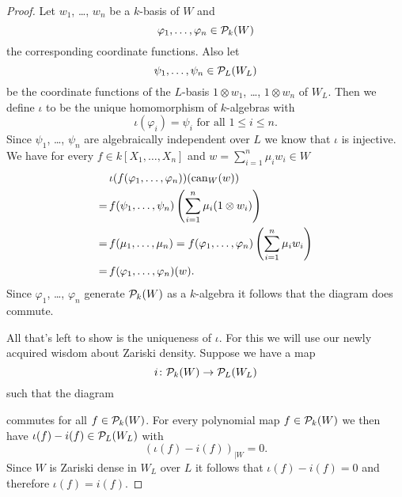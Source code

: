 \begin{proof}
 Let $w_1$, \dots, $w_n$ be a $k$-basis of $W$ and
 \[
  \varphi_1, \dotsc, \varphi_n \in \mathcal{P}_k(W)
 \]
 the corresponding coordinate functions. Also let
 \[
  \psi_1, \dotsc, \psi_n \in \mathcal{P}_L(W_L)
 \]
 be the coordinate functions of the $L$-basis $1 \otimes w_1$, \dots, $1 \otimes w_n$ of $W_L$. Then we define $\iota$ to be the unique homomorphism of $k$-algebras with
 \[
  \iota(\varphi_i) = \psi_i \text{ for all } 1 \leq i \leq n.
 \]
 Since $\psi_1$, \dots, $\psi_n$ are algebraically independent over $L$ we know that $\iota$ is injective. We have for every $f \in k[X_1, \dotsc, X_n]$ and $w = \sum_{i=1}^n \mu_i w_i \in W$
 \begin{align*}
   &\, \iota(f(\varphi_1, \dotsc, \varphi_n))(\operatorname{can}_W(w)) \\
  =&\, f(\psi_1, \dotsc, \psi_n)\left(\sum_{i=1}^n \mu_i (1 \otimes w_i)\right) \\
  =&\, f(\mu_1, \dotsc, \mu_n)
  = f(\varphi_1, \dotsc, \varphi_n)\left(\sum_{i=1}^n \mu_i w_i\right) \\
  =&\, f(\varphi_1, \dotsc, \varphi_n)(w).
 \end{align*}
 Since $\varphi_1$, \dots, $\varphi_n$ generate $\mathcal{P}_k(W)$ as a $k$-algebra it follows that the diagram does commute.
 
 All that’s left to show is the uniqueness of $\iota$. For this we will use our newly acquired wisdom about Zariski density. Suppose we have a map
 \[
  i \colon \mathcal{P}_k(W) \to \mathcal{P}_L(W_L)
 \]
 such that the diagram
  \begin{center}
 \end{center}
 commutes for all $f \in \mathcal{P}_k(W)$. For every polynomial map $f \in \mathcal{P}_k(W)$ we then have \mbox{$\iota(f)-i(f) \in \mathcal{P}_L(W_L)$} with
 \[
  \left( \iota(f)-i(f) \right)_{|W} = 0.
 \]
 Since $W$ is Zariski dense in $W_L$ over $L$ it follows that $\iota(f) - i(f) = 0$ and therefore $\iota(f) = i(f)$.
\end{proof}


